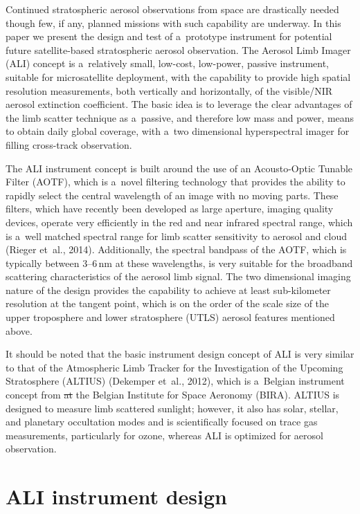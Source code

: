 \documentclass[amtd, online, hvmath]{copernicus}
\providecommand{\DIFdel}[1]{{\protect\color{red}\sout{#1}}}                      %
\providecommand{\DIFdelbegin}{} %
\providecommand{\DIFdelend}{} %
\begin{document}
Continued stratospheric aerosol observations from space are
drastically needed though few, if any, planned missions with such
capability are underway. In this paper we present the design and test
of a~prototype instrument for potential future satellite-based
stratospheric aerosol observation. The Aerosol Limb Imager (ALI)
concept is a~relatively small, low-cost, low-power, passive
instrument, suitable for microsatellite deployment, with the
capability to provide high spatial resolution measurements, both
vertically and horizontally, of the visible/NIR aerosol extinction
coefficient. The basic idea is to leverage the clear advantages of the
limb scatter technique as a~passive, and therefore low mass and power,
means to obtain daily global coverage, with a~two dimensional
hyperspectral imager for filling cross-track observation.

The ALI instrument concept is built around the use of an Acousto-Optic
Tunable Filter (AOTF), which is a~novel filtering technology that
provides the ability to rapidly select the central wavelength of an
image with no moving parts. These filters, which have recently been
developed as large aperture, imaging quality devices, operate very
efficiently in the red and near infrared spectral range, which is
a~well matched spectral range for limb scatter sensitivity to aerosol
and cloud (Rieger et~al., 2014).  Additionally, the spectral bandpass
of the AOTF, which is typically between 3--6\,\unit{nm} at these
wavelengths, is very suitable for the broadband scattering
characteristics of the aerosol limb signal. The two dimensional
imaging nature of the design provides the capability to achieve at
least sub-kilometer resolution at the tangent point, which is on the
order of the scale size of the upper troposphere and lower
stratosphere (UTLS) aerosol features mentioned above.

It should be noted that the basic instrument design concept of ALI is
very similar to that of the Atmospheric Limb Tracker for the
Investigation of the Upcoming Stratosphere (ALTIUS) (Dekemper et~al.,
2012), which is a~Belgian instrument concept from \DIFdelbegin \DIFdel{at }\DIFdelend the Belgian
Institute for Space Aeronomy (BIRA).  ALTIUS is designed to measure
limb scattered sunlight; however, it also has solar, stellar, and
planetary occultation modes and is scientifically focused on trace gas
measurements, particularly for ozone, whereas ALI is optimized for
aerosol observation.

\section{ALI instrument design}
\end{document}
